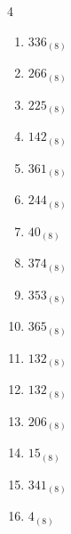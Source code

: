 \begin{multicols}{4}
\begin{enumerate}
  \item $336_{(8)}$

        \phantom{$=222$}

\columnbreak %

  \item $266_{(8)}$

        \phantom{$=182$}

  \item $225_{(8)}$

        \phantom{$=149$}

  \item $142_{(8)}$

        \phantom{$=98$}

  \item $361_{(8)}$

        \phantom{$=241$}

  \item $244_{(8)}$

        \phantom{$=164$}

  \item $40_{(8)}$

        \phantom{$=32$}

  \item $374_{(8)}$

        \phantom{$=252$}

  \item $353_{(8)}$

        \phantom{$=235$}

  \item $365_{(8)}$

        \phantom{$=245$}

  \item $132_{(8)}$

        \phantom{$=90$}

  \item $132_{(8)}$

        \phantom{$=90$}

  \item $206_{(8)}$

        \phantom{$=134$}

  \item $15_{(8)}$

        \phantom{$=13$}

  \item $341_{(8)}$

        \phantom{$=225$}

  \item $4_{(8)}$


\end{enumerate}
\end{multicols}
